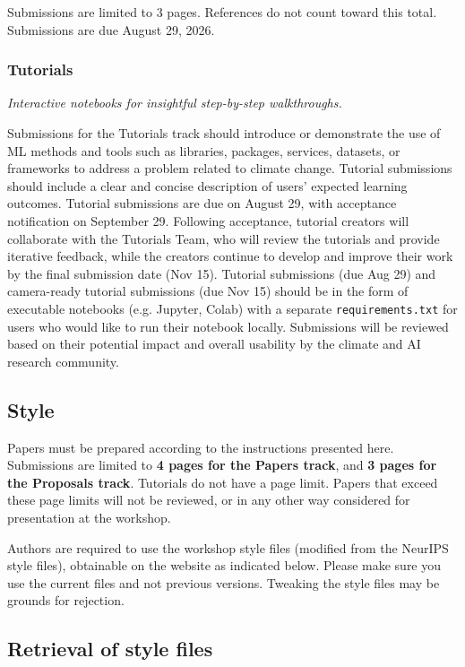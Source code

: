 \documentclass{article}
\begin{document}
Submissions are limited to 3 pages. References do not count toward this total. Submissions are due August 29, 2026.

\subsubsection{Tutorials}
\textit{Interactive notebooks for insightful step-by-step walkthroughs.}

Submissions for the Tutorials track should introduce or demonstrate the use of ML methods and tools such as libraries, packages, services, datasets, or frameworks to address a problem related to climate change. Tutorial submissions should include a clear and concise description of users' expected learning outcomes. Tutorial submissions are due on August 29, with acceptance notification on September 29. Following acceptance, tutorial creators will collaborate with the Tutorials Team, who will review the tutorials and provide iterative feedback, while the creators continue to develop and improve their work by the final submission date (Nov 15). Tutorial submissions (due Aug 29) and camera-ready tutorial submissions (due Nov 15) should be in the form of executable notebooks (e.g. Jupyter, Colab) with a separate \texttt{requirements.txt} for users who would like to run their notebook locally. Submissions will be reviewed based on their potential impact and overall usability by the climate and AI research community.


\subsection{Style}

Papers must be prepared according to the instructions presented here.   Submissions are limited to \textbf{4 pages for the Papers track}, and \textbf{3 pages for the Proposals track}. Tutorials do not have a page limit. Papers that exceed these page limits will not be reviewed, or in any other way considered for presentation at the workshop.


Authors are required to use the workshop style files (modified from the NeurIPS style files), obtainable on the website as indicated below. Please make sure you use the current files and not previous versions. Tweaking the style files may be grounds for
rejection.

\subsection{Retrieval of style files}
\end{document}
